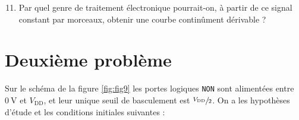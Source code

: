 \documentclass[a4paper,french,bookmarks]{article}
\begin{document}
    \begin{enumerate}
        \setcounter{enumi}{10}
        \item Par quel genre de traitement électronique pourrait-on, à partir de ce signal constant par morceaux, obtenir une courbe continûment dérivable ?
        
    \end{enumerate}
    
    \section{Deuxième problème}
    
    Sur le schéma de la figure \ref{fig:fig9} les portes logiques
    \texttt{NON} sont alimentées entre $\SI{0}{\volt}$ et
    $V_\text{DD}$, et leur unique seuil de basculement est
    $\sfrac{V_\text{DD}}{2}$. On a les hypothèses d'étude et les conditions initiales suivantes :
\end{document}
